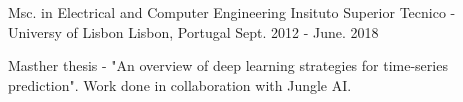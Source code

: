 

\begin{cventries}

  \cventry
    {Msc. in Electrical and Computer Engineering} %
    {Insituto Superior Tecnico - Universy of Lisbon} %
    {Lisbon, Portugal} %
    {Sept. 2012 - June. 2018} %
    {
      \begin{cvitems} %
        \item {Masther thesis - "An overview of deep learning strategies for time-series prediction". Work done in collaboration with Jungle AI.}
      \end{cvitems}
    }
\end{cventries}

